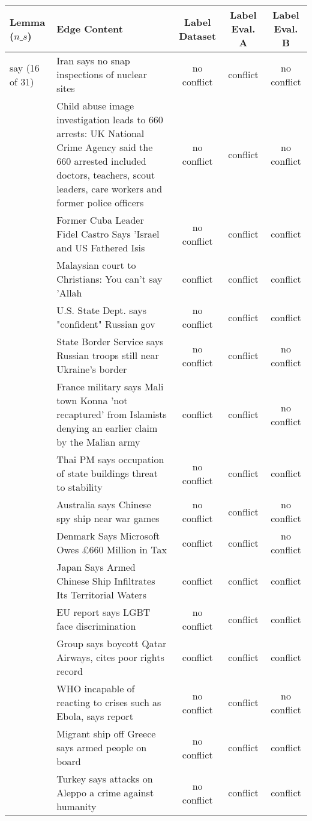 \begin{sidewaystable}[ht]
\centering
\begin{tabular}{l p{13cm} ccc}
\toprule
Lemma (\(n\_s\)) & Edge Content & Label Dataset & Label Eval. A & Label Eval. B \\
\midrule
say (16 of 31)
& Iran says no snap inspections of nuclear sites & no conflict & conflict & no conflict \\
& Child abuse image investigation leads to 660 arrests: UK National Crime Agency said the 660 arrested included doctors, teachers, scout leaders, care workers and former police officers & no conflict & conflict & no conflict \\
& Former Cuba Leader Fidel Castro Says 'Israel and US Fathered Isis & no conflict & conflict & conflict \\
& Malaysian court to Christians: You can't say 'Allah & conflict & conflict & conflict \\
& U.S. State Dept. says "confident" Russian gov & no conflict & conflict & conflict \\
& State Border Service says Russian troops still near Ukraine's border & no conflict & conflict & no conflict \\
& France military says Mali town Konna 'not recaptured' from Islamists denying an earlier claim by the Malian army & conflict & conflict & no conflict \\
& Thai PM says occupation of state buildings threat to stability & no conflict & conflict & conflict \\
& Australia says Chinese spy ship near war games & no conflict & conflict & no conflict \\
& Denmark Says Microsoft Owes  £660 Million in Tax & conflict & conflict & no conflict \\
& Japan Says Armed Chinese Ship Infiltrates Its Territorial Waters & conflict & conflict & conflict \\
& EU report says LGBT face discrimination & no conflict & conflict & conflict \\
& Group says boycott Qatar Airways, cites poor rights record & conflict & conflict & conflict \\
& WHO incapable of reacting to crises such as Ebola, says report & no conflict & conflict & no conflict \\
& Migrant ship off Greece says armed people on board & no conflict & conflict & conflict \\
& Turkey says attacks on Aleppo a crime against humanity & no conflict & conflict & conflict \\
\bottomrule
\end{tabular}
\caption{Dataset labels and evaluation labels for edges corresponding to predicate lemmas with the highest abs. diff. in precision between the evaluation runs with recall \(> 0\) and number of samples per lemma \(n_s >= 5\) for the evaluation runs \texttt{semsim-fix-lemma cn} (A) and \texttt{semsim-ctx e5 r-10-X} (B) (Num. ten of top ten lemma)}
\end{sidewaystable}


